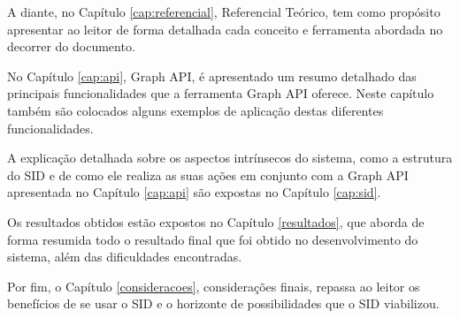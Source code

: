 A diante, no Capítulo \ref{cap:referencial}, Referencial Teórico, tem como propósito apresentar ao leitor de forma detalhada cada conceito e ferramenta abordada no decorrer do documento.

No Capítulo \ref{cap:api}, Graph API, é apresentado um resumo detalhado das principais funcionalidades que a ferramenta Graph API oferece. Neste capítulo também são colocados alguns exemplos de aplicação destas diferentes funcionalidades.

A explicação detalhada sobre os aspectos intrínsecos do sistema, como a estrutura do SID e de como ele realiza as suas ações em conjunto com a Graph API apresentada no Capítulo \ref{cap:api} são expostas no Capítulo \ref{cap:sid}.

Os resultados obtidos estão expostos no Capítulo \ref{resultados}, que aborda de forma resumida todo o resultado final que foi obtido no desenvolvimento do sistema, além das dificuldades encontradas.

Por fim, o Capítulo \ref{consideracoes}, considerações finais, repassa ao leitor os benefícios de se usar o SID e o horizonte de possibilidades que o SID viabilizou.

